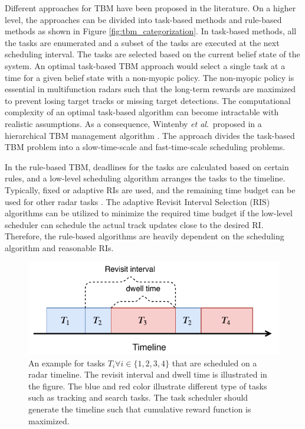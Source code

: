 \documentclass[english, 12pt, a4paper, elec, utf8, a-1b, online]{aaltothesis}
\newcommand{\etal}{\textit{et al}.~}
\begin{document}
Different approaches for TBM have been proposed in the literature.
On a higher level, the approaches can be divided into task-based methods and rule-based methods as shown in Figure \ref{fig:tbm_categorization}.
In task-based methods, all the tasks are enumerated and a subset of the tasks are executed at the next scheduling interval.
The tasks are selected based on the current belief state of the system. 
An optimal task-based TBM approach would select a single task at a time for a given belief state with a non-myopic policy.
The non-myopic policy is essential in multifunction radars such that the long-term rewards are maximized to prevent losing target tracks or missing target detections.
The computational complexity of an optimal task-based algorithm can become intractable with realistic assumptions. 
As a consequence, Wintenby \etal proposed in \cite{Wintenby2006} a hierarchical TBM management algorithm \cite{Wintenby2006}.
The approach divides the task-based TBM problem into a slow-time-scale and fast-time-scale scheduling problems.

In the rule-based TBM, deadlines for the tasks are calculated based on certain rules, and a low-level scheduling algorithm arranges the tasks to the timeline.
Typically, fixed or adaptive RIs are used, and the remaining time budget can be used for other radar tasks  \cite{Keuk1975, Cohen1986, Gardner1988, Munu1992, vanKeuk1993, Watson1993, Daeipour1994, Shin1995, Benoudnine2006, ChengTing2007, Baek2010, Charlish2015, Zamani2017, MasoumiGanjgah2017, Christiansen2018, Pilte2018}.
The adaptive Revisit Interval Selection (RIS) algorithms can be utilized to minimize the required time budget if the low-level scheduler can schedule the actual track updates close to the desired RI.
Therefore, the rule-based algorithms are heavily dependent on the scheduling algorithm and reasonable RIs.


\begin{figure}[h]
    \centering
    \includegraphics{figures/timeline.pdf}
    \caption{
        An example for tasks $T_i \forall i\in\{1,2,3,4\}$ that are scheduled on a radar timeline. 
        The revisit interval and dwell time is illustrated in the figure.
        The blue and red color illustrate different type of tasks such as tracking and search tasks.
        The task scheduler should generate the timeline such that cumulative reward function is maximized. 
    }
    \label{fig:timeline}
\end{figure}
\end{document}

